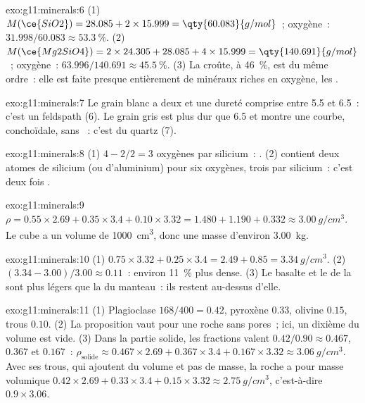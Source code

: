 \begin{solution}{exo:g11:minerals:6}
(1) $M(\ce{SiO2}) = 28.085 + 2 \times 15.999 = \qty{60.083}{g/mol}$~;
oxygène~: $31.998/60.083 \approx \qty{53.3}{\percent}$.
(2) $M(\ce{Mg2SiO4}) = 2 \times 24.305 + 28.085 + 4 \times 15.999 =
\qty{140.691}{g/mol}$~; oxygène~: $63.996/140.691 \approx \qty{45.5}{\percent}$.
(3) La croûte, à \qty{46}{\percent}, est du même ordre~: elle est faite
presque entièrement de minéraux riches en oxygène, les .
\end{solution}

\begin{solution}{exo:g11:minerals:7}
Le grain blanc a deux  et une dureté comprise entre 5.5 et 6.5~:
c'est un feldspath (6). Le grain gris est plus dur que 6.5 et montre une
 courbe, conchoïdale, sans ~: c'est du quartz (7).
\end{solution}

\begin{solution}{exo:g11:minerals:8}
(1) $4 - 2/2 = 3$ oxygènes par silicium~: . (2) 
contient deux atomes de silicium (ou d'aluminium) pour six oxygènes, trois
par silicium~: c'est deux fois .
\end{solution}

\begin{solution}{exo:g11:minerals:9}
$\rho = 0.55 \times 2.69 + 0.35 \times 3.4 + 0.10 \times 3.32 = 1.480 + 1.190
+ 0.332 \approx \qty{3.00}{g/cm^3}$. Le cube a un volume de
\qty{1000}{cm^3}, donc une masse d'environ \qty{3.00}{kg}.
\end{solution}

\begin{solution}{exo:g11:minerals:10}
(1) $0.75 \times 3.32 + 0.25 \times 3.4 = 2.49 + 0.85 = \qty{3.34}{g/cm^3}$.
(2) $(3.34 - 3.00)/3.00 \approx 0.11$~: environ \qty{11}{\percent} plus
dense. (3) Le basalte et le  de la  sont plus légers
que la  du manteau~: ils restent au-dessus d'elle.
\end{solution}

\begin{solution}{exo:g11:minerals:11}
(1) Plagioclase $168/400 = 0.42$, pyroxène $0.33$, olivine $0.15$, trous
$0.10$. (2) La proposition vaut pour une roche sans pores~; ici, un dixième
du volume est vide. (3) Dans la partie solide, les fractions valent
$0.42/0.90
\approx 0.467$, $0.367$ et $0.167$~:
$\rho_{\text{solide}} \approx 0.467 \times 2.69 + 0.367 \times 3.4 + 0.167
\times 3.32 \approx \qty{3.06}{g/cm^3}$. Avec ses trous, qui ajoutent du
volume et pas de masse, la roche a pour masse volumique
$0.42 \times 2.69 + 0.33 \times 3.4 +
0.15 \times 3.32 \approx \qty{2.75}{g/cm^3}$, c'est-à-dire $0.9 \times 3.06$.
\end{solution}

